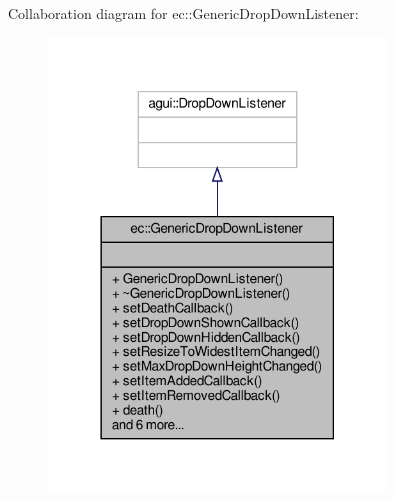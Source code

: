 Collaboration diagram for ec\+:\+:Generic\+Drop\+Down\+Listener\+:\nopagebreak
\begin{figure}[H]
\begin{center}
\leavevmode
\includegraphics[width=254pt]{classec_1_1_generic_drop_down_listener__coll__graph}
\end{center}
\end{figure}
